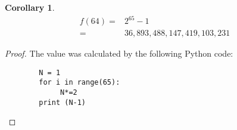 \documentclass[]{article}
\newtheorem{cor}[thm]{Corollary}
\begin{document}
\begin{cor}
	\begin{align*}
		f(64) =& 2^{65}-1\\
		=& 36,893,488,147,419,103,231
	\end{align*}
\end{cor}

\begin{proof}
	The value was calculated by the following Python code:
	\begin{verbatim}
		N = 1
		for i in range(65):
	 	     N*=2
		print (N-1)
	\end{verbatim}
\end{proof}


%
%
\end{document}
